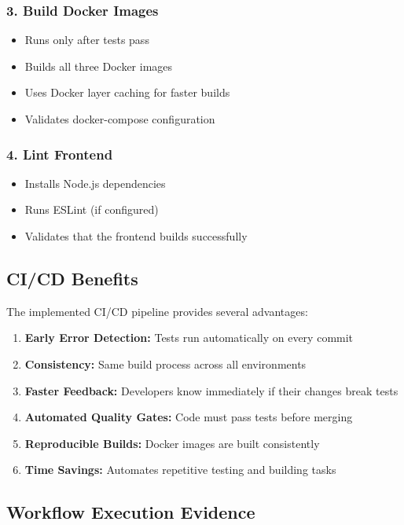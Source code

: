 \documentclass[12pt,a4paper]{article}
\begin{document}
\subsubsection{3. Build Docker Images}
\begin{itemize}
    \item Runs only after tests pass
    \item Builds all three Docker images
    \item Uses Docker layer caching for faster builds
    \item Validates docker-compose configuration
\end{itemize}

\subsubsection{4. Lint Frontend}
\begin{itemize}
    \item Installs Node.js dependencies
    \item Runs ESLint (if configured)
    \item Validates that the frontend builds successfully
\end{itemize}

\subsection{CI/CD Benefits}

The implemented CI/CD pipeline provides several advantages:

\begin{enumerate}
    \item \textbf{Early Error Detection:} Tests run automatically on every commit
    \item \textbf{Consistency:} Same build process across all environments
    \item \textbf{Faster Feedback:} Developers know immediately if their changes break tests
    \item \textbf{Automated Quality Gates:} Code must pass tests before merging
    \item \textbf{Reproducible Builds:} Docker images are built consistently
    \item \textbf{Time Savings:} Automates repetitive testing and building tasks
\end{enumerate}

\subsection{Workflow Execution Evidence}
\end{document}
